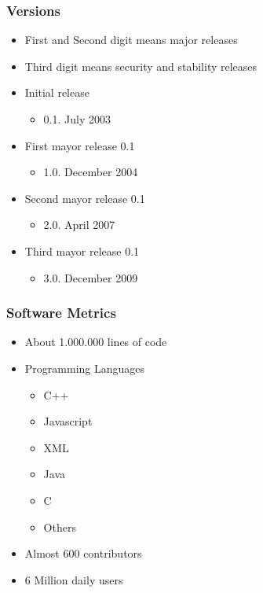 \documentclass{beamer}
\begin{document}
\begin{frame}
 \frametitle{Versions}
 \begin{itemize}
 \item First and Second digit means major releases
 \item Third digit means security and stability releases
 \item Initial release
    \begin{itemize}
     \item 0.1. July 2003
    \end{itemize}

 \item First mayor release 0.1
    \begin{itemize}
     \item 1.0. December 2004
    \end{itemize}

 \item Second mayor release 0.1
    \begin{itemize}
     \item 2.0. April 2007
    \end{itemize}

 \item Third mayor release 0.1
    \begin{itemize}
     \item 3.0. December 2009
    \end{itemize}

 \end{itemize}
\end{frame}


\begin{frame}
\frametitle{Software Metrics}
 \begin{itemize}
 \item About 1.000.000 lines of code
 \item Programming Languages
    \begin{itemize}
     \item C++
     \item Javascript
     \item XML
     \item Java
     \item C
     \item Others
    \end{itemize}
 \item Almost 600 contributors
 \item 6 Million daily users
 \end{itemize}
\end{frame}
\end{document}

